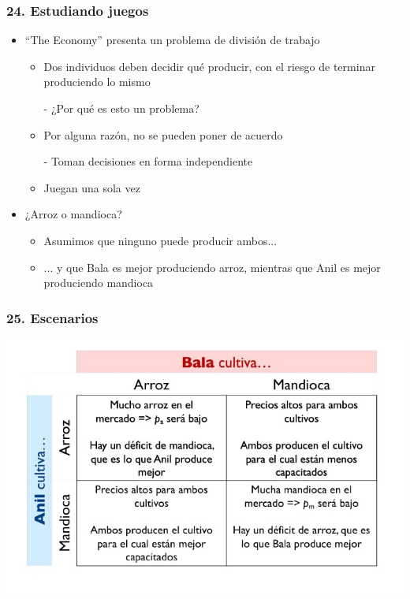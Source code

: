 \documentclass[14pt]{beamer}
\begin{document}
\begin{frame}
\frametitle{24. Estudiando juegos}
\begin{itemize}
\item “The Economy” presenta un problema de división de trabajo
\begin{itemize}
    \item Dos individuos deben decidir qué producir, con el riesgo de terminar produciendo lo mismo
        \begin{itemize}
        - ¿Por qué es esto un problema?
        \end{itemize}
        \item Por alguna razón, no se pueden poner de acuerdo
        \begin{itemize}
        - Toman decisiones en forma independiente
        \end{itemize}
        \item Juegan una sola vez
        \end{itemize}
    \item ¿Arroz o mandioca?
        \begin{itemize}
        \item Asumimos que ninguno puede producir ambos...
        \item ... y que Bala es mejor produciendo arroz, mientras que Anil es mejor produciendo mandioca
    \end{itemize}
\end{itemize}
\end{frame}

\begin{frame}
\frametitle{25. Escenarios}
\centering
\includegraphics[scale=0.65]{Figures/Tema_03_7_bala.jpg}
\end{frame}
\end{document}
